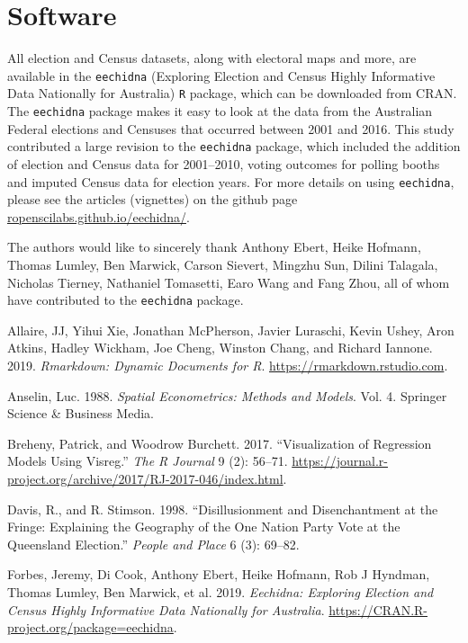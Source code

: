 \documentclass[times, doublespace]{anzsauth}
\begin{document}
\hypertarget{software}{%
\section{Software}\label{software}}

All election and Census datasets, along with electoral maps and more, are available in the \texttt{eechidna} (Exploring Election and Census Highly Informative Data Nationally for Australia) \texttt{R} package, which can be downloaded from CRAN. The \texttt{eechidna} package makes it easy to look at the data from the Australian Federal elections and Censuses that occurred between 2001 and 2016. This study contributed a large revision to the \texttt{eechidna} package, which included the addition of election and Census data for 2001--2010, voting outcomes for polling booths and imputed Census data for election years. For more details on using \texttt{eechidna}, please see the articles (vignettes) on the github page \href{https://ropenscilabs.github.io/eechidna/}{ropenscilabs.github.io/eechidna/}.

The authors would like to sincerely thank Anthony Ebert, Heike Hofmann, Thomas Lumley, Ben Marwick, Carson Sievert, Mingzhu Sun, Dilini Talagala, Nicholas Tierney, Nathaniel Tomasetti, Earo Wang and Fang Zhou, all of whom have contributed to the \texttt{eechidna} package.

\hypertarget{refs}{}
\leavevmode\hypertarget{ref-rmarkdown}{}%
Allaire, JJ, Yihui Xie, Jonathan McPherson, Javier Luraschi, Kevin Ushey, Aron Atkins, Hadley Wickham, Joe Cheng, Winston Chang, and Richard Iannone. 2019. \emph{Rmarkdown: Dynamic Documents for R}. \url{https://rmarkdown.rstudio.com}.

\leavevmode\hypertarget{ref-Anselin88}{}%
Anselin, Luc. 1988. \emph{Spatial Econometrics: Methods and Models}. Vol. 4. Springer Science \& Business Media.

\leavevmode\hypertarget{ref-visreg}{}%
Breheny, Patrick, and Woodrow Burchett. 2017. ``Visualization of Regression Models Using Visreg.'' \emph{The R Journal} 9 (2): 56--71. \url{https://journal.r-project.org/archive/2017/RJ-2017-046/index.html}.

\leavevmode\hypertarget{ref-DavisStimson98}{}%
Davis, R., and R. Stimson. 1998. ``Disillusionment and Disenchantment at the Fringe: Explaining the Geography of the One Nation Party Vote at the Queensland Election.'' \emph{People and Place} 6 (3): 69--82.

\leavevmode\hypertarget{ref-eechidna}{}%
Forbes, Jeremy, Di Cook, Anthony Ebert, Heike Hofmann, Rob J Hyndman, Thomas Lumley, Ben Marwick, et al. 2019. \emph{Eechidna: Exploring Election and Census Highly Informative Data Nationally for Australia}. \url{https://CRAN.R-project.org/package=eechidna}.
\end{document}
